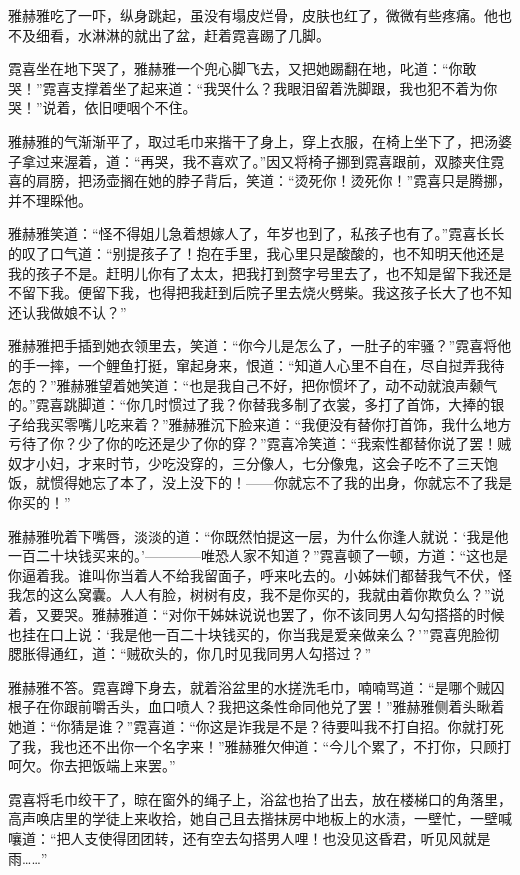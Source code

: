 \par 雅赫雅吃了一吓，纵身跳起，虽没有塌皮烂骨，皮肤也红了，微微有些疼痛。他也不及细看，水淋淋的就出了盆，赶着霓喜踢了几脚。
\par 霓喜坐在地下哭了，雅赫雅一个兜心脚飞去，又把她踢翻在地，叱道：“你敢哭！”霓喜支撑着坐了起来道：“我哭什么？我眼泪留着洗脚跟，我也犯不着为你哭！”说着，依旧哽咽个不住。
\par 雅赫雅的气渐渐平了，取过毛巾来揩干了身上，穿上衣服，在椅上坐下了，把汤婆子拿过来渥着，道：“再哭，我不喜欢了。”因又将椅子挪到霓喜跟前，双膝夹住霓喜的肩膀，把汤壶搁在她的脖子背后，笑道：“烫死你！烫死你！”霓喜只是腾挪，并不理睬他。
\par 雅赫雅笑道：“怪不得姐儿急着想嫁人了，年岁也到了，私孩子也有了。”霓喜长长的叹了口气道：“别提孩子了！抱在手里，我心里只是酸酸的，也不知明天他还是我的孩子不是。赶明儿你有了太太，把我打到赘字号里去了，也不知是留下我还是不留下我。便留下我，也得把我赶到后院子里去烧火劈柴。我这孩子长大了也不知还认我做娘不认？”
\par 雅赫雅把手插到她衣领里去，笑道：“你今儿是怎么了，一肚子的牢骚？”霓喜将他的手一摔，一个鲤鱼打挺，窜起身来，恨道：“知道人心里不自在，尽自挝弄我待怎的？”雅赫雅望着她笑道：“也是我自己不好，把你惯坏了，动不动就浪声颡气的。”霓喜跳脚道：“你几时惯过了我？你替我多制了衣裳，多打了首饰，大捧的银子给我买零嘴儿吃来着？”雅赫雅沉下脸来道：“我便没有替你打首饰，我什么地方亏待了你？少了你的吃还是少了你的穿？”霓喜冷笑道：“我索性都替你说了罢！贼奴才小妇，才来时节，少吃没穿的，三分像人，七分像鬼，这会子吃不了三天饱饭，就惯得她忘了本了，没上没下的！——你就忘不了我的出身，你就忘不了我是你买的！”
\par 雅赫雅吮着下嘴唇，淡淡的道：“你既然怕提这一层，为什么你逢人就说：‘我是他一百二十块钱买来的。'————唯恐人家不知道？”霓喜顿了一顿，方道：“这也是你逼着我。谁叫你当着人不给我留面子，呼来叱去的。小姊妹们都替我气不伏，怪我怎的这么窝囊。人人有脸，树树有皮，我不是你买的，我就由着你欺负么？”说着，又要哭。雅赫雅道：“对你干姊妹说说也罢了，你不该同男人勾勾搭搭的时候也挂在口上说：‘我是他一百二十块钱买的，你当我是爱亲做亲么？'”霓喜兜脸彻腮胀得通红，道：“贼砍头的，你几时见我同男人勾搭过？”
\par 雅赫雅不答。霓喜蹲下身去，就着浴盆里的水搓洗毛巾，喃喃骂道：“是哪个贼囚根子在你跟前嚼舌头，血口喷人？我把这条性命同他兑了罢！”雅赫雅侧着头瞅着她道：“你猜是谁？”霓喜道：“你这是诈我是不是？待要叫我不打自招。你就打死了我，我也还不出你一个名字来！”雅赫雅欠伸道：“今儿个累了，不打你，只顾打呵欠。你去把饭端上来罢。”
\par 霓喜将毛巾绞干了，晾在窗外的绳子上，浴盆也抬了出去，放在楼梯口的角落里，高声唤店里的学徒上来收拾，她自己且去揩抹房中地板上的水渍，一壁忙，一壁喊嚷道：“把人支使得团团转，还有空去勾搭男人哩！也没见这昏君，听见风就是雨……”
